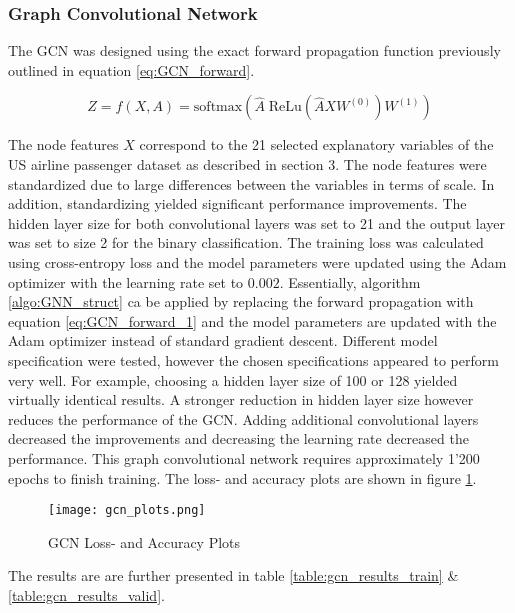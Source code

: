   \subsubsection{Graph Convolutional Network}

  The GCN was designed using the exact forward propagation function
  previously outlined in equation \ref{eq:GCN_forward}.

  \begin{equation}
	  Z = f(X,A) = \text{softmax}\left(\hat A \;\text{ReLu}\left(\hat A X
	  W^{(0)}\right)W^{(1)}\right)
      \label{eq:GCN_forward_1}
  \end{equation}

  \noindent The node features $X$ correspond to the 21 selected explanatory 
  variables of the US airline passenger dataset as described in section 3. The
  node features were standardized due to large differences between the
  variables in terms of scale. In addition, standardizing yielded significant
  performance improvements. The hidden layer size for both convolutional layers
  was set to 21 and the output layer was set to size 2 for the binary
  classification. The training loss was calculated using cross-entropy loss and 
  the model parameters were updated using the Adam optimizer
  \citep{kingma2014adam} with the learning rate set to $0.002$. Essentially,
  algorithm \ref{algo:GNN_struct} ca be applied by replacing the forward
  propagation with equation \ref{eq:GCN_forward_1} and the model parameters are
  updated with the Adam optimizer instead of standard gradient descent.
  Different model specification were tested, however the chosen specifications
  appeared to perform very well. For example, choosing a hidden layer size of
  100 or 128 yielded virtually identical results. A stronger reduction in
  hidden layer size however reduces the performance of the GCN. Adding additional
  convolutional layers decreased the improvements and decreasing the learning
  rate decreased the performance. This graph convolutional network requires
  approximately 1'200 epochs to finish training. The loss- and accuracy plots
  are shown in figure \ref{fig:gcn_plots}.

  \begin{figure}[h]
		\centering
		\texttt{[image: gcn\_plots.png]}
		\caption{GCN Loss- and Accuracy Plots}
        \label{fig:gcn_plots}
  \end{figure}

  \noindent The results are are further presented in table
  \ref{table:gcn_results_train} \& \ref{table:gcn_results_valid}. 

